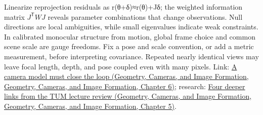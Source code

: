 Linearize reprojection residuals as r(θ+δ)≈r(θ)+Jδ; the weighted information matrix \(J^{\mathsf T}WJ\) reveals parameter combinations that change observations. Null directions are local ambiguities, while small eigenvalues indicate weak constraints. In calibrated monocular structure from motion, global frame choice and common scene scale are gauge freedoms. Fix a pose and scale convention, or add a metric measurement, before interpreting covariance. Repeated nearly identical views may leave focal length, depth, and pose coupled even with many pixels. Link: \href{../03-Geometry-Cameras-and-Image-Formation/main.pdf\#nameddest=02-foundations-ii-ch037-a-camera-model-must-close-the-loop}{A camera model must close the loop (Geometry, Cameras, and Image Formation, Geometry, Cameras, and Image Formation, Chapter 6)}; research: \href{../03-Geometry-Cameras-and-Image-Formation/main.pdf\#nameddest=02-foundations-ii-ch036-four-deeper-links-from-the-tum-lecture-review}{Four deeper links from the TUM lecture review (Geometry, Cameras, and Image Formation, Geometry, Cameras, and Image Formation, Chapter 5)}.
